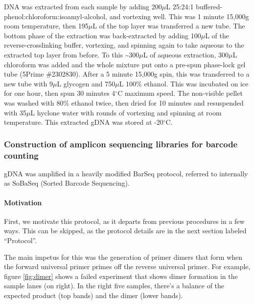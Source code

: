 {DNA was extracted from each sample by adding 200\(\mu\)L 25:24:1
buffered-phenol:chloroform:isoamyl-alcohol, and vortexing well. This was
1 minute 15,000g room temperature, then 195\(\mu\)L of the top layer was
transferred a new tube. The bottom phase of the extraction was
back-extracted by adding 100\(\mu\)L of the reverse-crosslinking buffer,
vortexing, and spinning again to take aqueous to the extracted top layer
from before. To this \textasciitilde{}300\(\mu\)L of aqueous extraction,
300\(\mu\)L chloroform was added and the whole mixture put onto a
pre-spun phase-lock gel tube (5Prime \#2302830). After a 5 minute
15,000g spin, this was transferred to a new tube with 9\(\mu\)L glycogen
and 750\(\mu\)L 100\% ethanol. This was incubated on ice for one hour,
then spun 30 minutes 4\(^{\circ}\)C maximum speed. The non-visible
pellet was washed with 80\% ethanol twice, then dried for 10 minutes and
resuspended with 35\(\mu\)L hyclone water with rounds of vortexing and
spinning at room temperature. This extracted gDNA was stored at
-20\(^{\circ}\)C.

\subsubsection{Construction of amplicon sequencing libraries for barcode
counting}\label{construction-of-amplicon-sequencing-libraries-for-barcode-counting}

gDNA was amplified in a heavily modified BarSeq protocol, referred to
internally as SoBaSeq (Sorted Barcode Sequencing).

\paragraph{Motivation}\label{motivation}

First, we motivate this protocol, as it departs from previous procedures
in a few ways. This can be skipped, as the protocol details are in the
next section labeled ``Protocol''.

The main impetus for this was the generation of primer dimers that form
when the forward universal primer primes off the reverse universal
primer. For example, figure \ref{fig:dimer} shows a failed experiment
that shows dimer formation in the sample lanes (on right). In the right
five samples, there's a balance of the expected product (top bands) and
the dimer (lower bands).

\vspace{2em}

}
